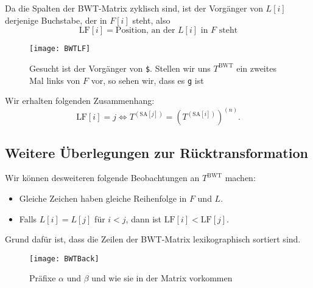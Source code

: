 \begin{minipage}{.65\textwidth}
  Da die Spalten der BWT-Matrix zyklisch sind, ist der Vorgänger von \( L[i] \) derjenige Buchstabe, der in \( F[i] \) steht, also
  \begin{equation*}
    \text{LF}[i] = \text{Position, an der } L[i] \text{ in } F \text{ steht}
  \end{equation*}
\end{minipage}
\hfill
\begin{minipage}{.3\textwidth}
  \begin{figure}[H]
    \texttt{[image: BWTLF]}
    \caption{Gesucht ist der Vorgänger von \texttt{\$}. Stellen wir uns \( T^{\text{BWT}} \) ein zweites Mal links von \( F \) vor, so sehen wir, dass es \texttt{g} ist}
  \end{figure}
\end{minipage}

Wir erhalten folgenden Zusammenhang:
\begin{equation*}
  \text{LF}[i] = j \Leftrightarrow T^{(\text{SA}[j])} = {\left( T^{(\text{SA}[i])} \right)}^{(n)}\text{.}
\end{equation*}

\subsection{Weitere Überlegungen zur Rücktransformation}

Wir können desweiteren folgende Beobachtungen an \( T^{\text{BWT}} \) machen:

\begin{minipage}{.6\textwidth}
  \begin{itemize}
    \item Gleiche Zeichen haben gleiche Reihenfolge in \( F \) und \( L \).
    \item Falls \( L[i] = L[j] \) für \( i < j \), dann ist \( \text{LF}[i] < \text{LF}[j] \).
  \end{itemize}
  Grund dafür ist, dass die Zeilen der BWT-Matrix lexikographisch sortiert sind.
\end{minipage}
\hfill
\begin{minipage}{.35\textwidth}
  \begin{figure}[H]
    \texttt{[image: BWTBack]}
    \caption{Präfixe \( \alpha \) und \( \beta \) und wie sie in der Matrix vorkommen}
  \end{figure}
\end{minipage}

